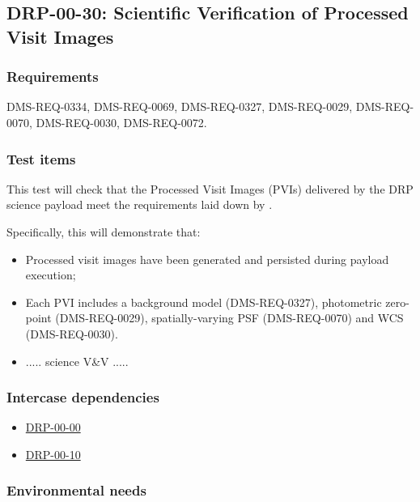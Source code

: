 \subsection{DRP-00-30: Scientific Verification of Processed Visit Images}
\label{drp-00-30}

\subsubsection{Requirements}

DMS-REQ-0334, DMS-REQ-0069, DMS-REQ-0327, DMS-REQ-0029, DMS-REQ-0070,
DMS-REQ-0030, DMS-REQ-0072.

\subsubsection{Test items}
\label{drp-00-30-items}

This test will check that the Processed Visit Images (PVIs) delivered by the
DRP science payload meet the requirements laid down by .

Specifically, this will demonstrate that:

\begin{itemize}

  \item{Processed visit images have been generated and persisted during
  payload execution;}
  \item{Each PVI includes a background model (DMS-REQ-0327), photometric
  zero-point (DMS-REQ-0029), spatially-varying PSF (DMS-REQ-0070) and WCS
  (DMS-REQ-0030).}
  \item{..... science V\&V .....}

\end{itemize}

\subsubsection{Intercase dependencies}

\begin{itemize}

  \item{\hyperref[drp-00-00]{DRP-00-00}}
  \item{\hyperref[drp-00-10]{DRP-00-10}}

\end{itemize}

\subsubsection{Environmental needs}

